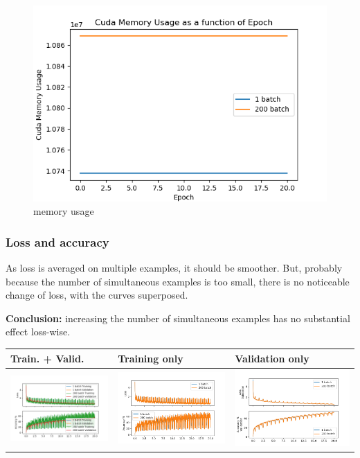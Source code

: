 \begin{figure}[ht]
\centering
\includegraphics{parts/appendix/reports-papud/2018_07_11-Simultaneous_batches/memory.png}
\caption{memory usage}
\end{figure}

\subsubsection{Loss and accuracy}

As loss is averaged on multiple examples, it should be smoother. But,
probably because the number of simultaneous examples is too small, there
is no noticeable change of loss, with the curves superposed.

\textbf{Conclusion:} increasing the number of simultaneous examples has
no substantial effect loss-wise.

\begin{longtable}[]{@{}lll@{}}
\hline
Train. + Valid. & Training only & Validation only\tabularnewline
\hline
\endhead
\includegraphics[width=.3\textwidth]{parts/appendix/reports-papud/2018_07_11-Simultaneous_batches/loss.png} & \includegraphics[width=.3\textwidth]{parts/appendix/reports-papud/2018_07_11-Simultaneous_batches/loss_train.png} &
\includegraphics[width=.3\textwidth]{parts/appendix/reports-papud/2018_07_11-Simultaneous_batches/loss_valid.png}\tabularnewline
\hline
\end{longtable}

